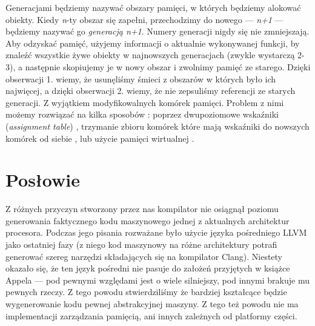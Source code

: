 \documentclass[11pt]{scrartcl}
\begin{document}
Generacjami będziemy nazywać obszary pamięci, w których będziemy alokować
obiekty. Kiedy \textit{n}-ty obszar się zapełni, przechodzimy do nowego --- \textit{n+1} --- będziemy
nazywać go \textit{generacją n+1}. Numery generacji nigdy się nie zmniejszają. Aby
odzyskać pamięć, użyjemy informacji o aktualnie wykonywanej funkcji, by znaleźć
wszystkie żywe obiekty w najnowszych generacjach (zwykle wystarczą 2-3), a
następnie skopiujemy je w nowy obszar i zwolnimy pamięć ze starego. Dzięki
obserwacji 1. wiemy, że usunęliśmy śmieci z obszarów w których było ich
najwięcej, a dzięki obserwacji 2. wiemy, że nie zepsuliśmy referencji ze starych
generacji. Z wyjątkiem modyfikowalnych komórek pamięci. Problem z nimi  możemy
rozwiązać na kilka sposobów \cite{Appel16.3}: poprzez dwupoziomowe wskaźniki (\textit{assignment
table}) \cite{Lieberman83}, trzymanie zbioru komórek które mają wskaźniki do nowszych komórek od
siebie \cite{Shaw87}, lub użycie pamięci wirtualnej \cite{Ungar86}.


\section{Posłowie}
Z różnych przyczyn stworzony przez nas kompilator nie osiągnął poziomu
generowania faktycznego kodu maszynowego jednej z aktualnych architektur
procesora. Podczas jego pisania rozważane było użycie języka pośredniego LLVM
jako ostatniej fazy (z niego kod maszynowy na różne architektury potrafi
generować szereg narzędzi składających się na kompilator Clang). Niestety
okazało się, że ten język pośredni nie pasuje do założeń przyjętych w książce
Appela --- pod pewnymi względami jest o wiele silniejszy, pod innymi brakuje mu
pewnych rzeczy. Z tego powodu stwierdziliśmy że bardziej kształcące będzie
wygenerowanie kodu pewnej abstrakcyjnej maszyny. Z tego też powodu nie ma
implementacji zarządzania pamięcią, ani innych zależnych od platformy części.



\end{document}
